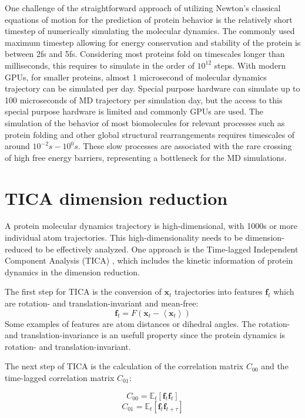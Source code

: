 One challenge of the straightforward approach of utilizing Newton's classical equations of motion for the prediction of protein behavior is the relatively short timestep of numerically simulating the molecular dynamics. The commonly used maximum timestep allowing for energy conservation and stability of the protein is between 2fs and 5fs. Considering most proteins fold on timescales longer than milliseconds, this requires to simulate in the order of $10^{12}$ steps. With modern GPUs, for smaller proteins, almost 1 microsecond of molecular dynamics trajectory can be simulated per day. Special purpose hardware \cite{shaw2014anton} can simulate up to 100 microseconds of MD trajectory per simulation day, but the access to this special purpose hardware is limited and commonly GPUs are used. The simulation of the behavior of most biomolecules for relevant processes such as protein folding and other global structural rearrangements requires timescales of around $10^{-2}s - 10^{0}s$. These slow processes are associated with the rare crossing of high free energy barriers, representing a bottleneck for the MD simulations.

\section{TICA dimension reduction}

A protein molecular dynamics trajectory is high-dimensional, with 1000s or more individual atom trajectories. This high-dimensionality needs to be dimension-reduced to be effectively analyzed. One approach is the Time-lagged
Independent Component Analysis (TICA) \cite{TICA1-perez2013, TICA2-schwantes2013}, which includes the kinetic information of protein dynamics in the dimension reduction.

The first step for TICA is the conversion of $\mathbf{x}_{t}$ trajectories into features $\mathbf{f}_{t}$ which are rotation- and translation-invariant and mean-free:
$$\mathbf{f}_{t}=F\left(\mathbf{x}_{t}-\left\langle \mathbf{x}_{t}\right\rangle \right)$$  
Some examples of features are atom distances or dihedral angles. The rotation- and translation-invariance is an usefull property since the protein dynamics is rotation- and translation-invariant.

The next step of TICA is the calculation of the correlation matrix $C_{00}$ and the time-lagged correlation matrix $C_{01}$:

$$C_{00}=\ensuremath{\mathbb{E}}_{t}\left[\mathbf{f}_{t}\mathbf{f}_{t}\right]$$
$$C_{01}=\ensuremath{\mathbb{E}}_{t}\left[\mathbf{f}_{t}\mathbf{f}_{t+\tau}\right]$$

